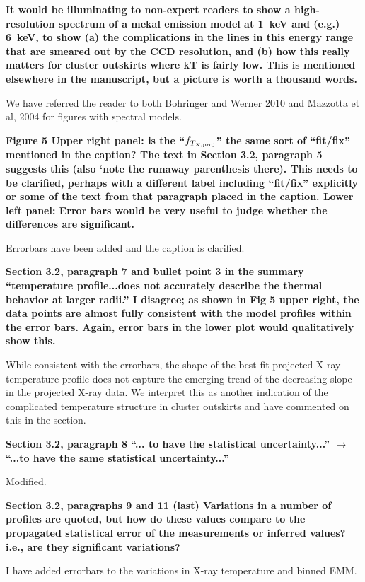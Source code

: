 \documentclass{article}
\begin{document}
{\bf 
It would be illuminating to non-expert readers to show a high-resolution
spectrum of a mekal emission model at 1~keV and (e.g.) 6~keV, to show (a)
the complications in the lines in this energy range that are smeared out by
the CCD resolution, and (b) how this really matters for cluster outskirts
where kT is fairly low. This is mentioned elsewhere in the manuscript, but
a picture is worth a thousand words.
}

We have referred the reader to both Bohringer and Werner 2010 and
Mazzotta et al, 2004 for figures with spectral models.  

{\bf 
Figure 5
Upper right panel: is the ``$f_{T_{X,{\rm proj}}}$'' the same sort of ``fit/fix'' mentioned
in the caption? The text in Section 3.2, paragraph 5 suggests this (also
`note the runaway parenthesis there). This needs to be clarified, perhaps
with a different label including ``fit/fix'' explicitly or some of the text
from that paragraph placed in the caption.
Lower left panel: Error bars would be very useful to judge whether the
differences are significant.
}

Errorbars have been added and the caption is clarified.

{\bf 
Section 3.2, paragraph 7 and bullet point 3 in the summary
``temperature profile...does not accurately describe the thermal
behavior at larger radii.''
I disagree; as shown in Fig 5 upper right, the data points are almost fully
consistent with the model profiles within the error bars. Again, error
bars in the lower plot would qualitatively show this.
}

While consistent with the errorbars, the shape of the best-fit
projected X-ray temperature profile does not capture the emerging
trend of the decreasing slope in the projected X-ray data.  We
interpret this as another indication of the complicated temperature
structure in cluster outskirts and have commented on this in the
section.

{\bf 
Section 3.2, paragraph 8
``... to have the statistical uncertainty...''
$\rightarrow$ ``...to have the same statistical uncertainty...''
}

Modified.

{\bf 
Section 3.2, paragraphs 9 and 11 (last)
Variations in a number of profiles are quoted, but how do these values
compare to the propagated statistical error of the measurements or inferred
values? i.e., are they significant variations?
}

I have added errorbars to the variations in X-ray temperature and
binned EMM.
\end{document}

